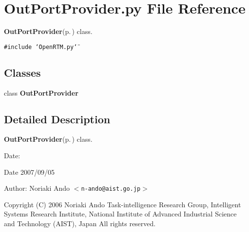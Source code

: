 \section{Out\-Port\-Provider.py File Reference}
\label{OutPortProvider_8py}
{\bf Out\-Port\-Provider}{\rm (p.\,\pageref{classOutPortProvider})} class. 

{\tt \#include \char`\"{}Open\-RTM.py\char`\"{}}\par
\subsection*{Classes}
\begin{CompactItemize}
\item 
class {\bf Out\-Port\-Provider}
\end{CompactItemize}


\subsection{Detailed Description}
{\bf Out\-Port\-Provider}{\rm (p.\,\pageref{classOutPortProvider})} class. 

\begin{Desc}
\item[Date:]\begin{Desc}
\item[Date]2007/09/05\end{Desc}
\end{Desc}
\begin{Desc}
\item[Author:]Noriaki Ando $<${\tt n-ando@aist.go.jp}$>$\end{Desc}
Copyright (C) 2006 Noriaki Ando Task-intelligence Research Group, Intelligent Systems Research Institute, National Institute of Advanced Industrial Science and Technology (AIST), Japan All rights reserved.